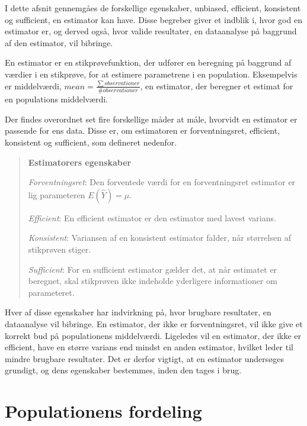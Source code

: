 \documentclass[]{book}
\theoremstyle{definition}
\theoremstyle{definition}
\theoremstyle{definition}
\theoremstyle{remark}
\let\BeginKnitrBlock\begin \let\EndKnitrBlock\end
\begin{document}
I dette afsnit gennemgåes de forskellige egenskaber, unbiased, efficient, konsistent og sufficient, en estimator kan have. Disse begreber giver et indblik i, hvor god en estimator er, og derved også, hvor valide resultater, en dataanalyse på baggrund af den estimator, vil bibringe.

En estimator er en stikprøvefunktion, der udfører en beregning på baggrund af værdier i en stikprøve, for at estimere parametrene i en population. Eksempelvis er middelværdi, \(mean = \frac{\sum observationer}{\# observationer}\), en estimator, der beregner et estimat for en populations middelværdi.

Der findes overordnet set fire forskellige måder at måle, hvorvidt en estimator er passende for ens data. Disse er, om estimatoren er forventningsret, efficient, konsistent og sufficient, som defineret nedenfor.

\begin{quote}
\BeginKnitrBlock{definition}
\protect\hypertarget{def:unnamed-chunk-5}{}{\label{def:unnamed-chunk-5} }\textbf{Estimatorers egenskaber} \citep{ASTAkursus3}

\emph{Forventningsret}: Den forventede værdi for en forventningsret estimator er lig parameteren \(E(\hat{Y}) = \mu\).

\emph{Efficient}: En efficient estimator er den estimator med lavest varians.

\emph{Konsistent}: Variansen af en konsistent estimator falder, når størrelsen af stikprøven stiger.

\emph{Sufficient}: For en sufficient estimator gælder det, at når estimatet er beregnet, skal stikprøven ikke indeholde yderligere informationer om parameteret.
\EndKnitrBlock{definition}
\end{quote}

Hver af disse egenskaber har indvirkning på, hvor brugbare resultater, en dataanalyse vil bibringe. En estimator, der ikke er forventningsret, vil ikke give et korrekt bud på populationens middelværdi. Ligeledes vil en estimator, der ikke er efficient, have en større varians end mindst en anden estimator, hvilket leder til mindre brugbare resultater. Det er derfor vigtigt, at en estimator undersøges grundigt, og dens egenskaber bestemmes, inden den tages i brug.

\hypertarget{populationens-fordeling}{%
\section{Populationens fordeling}\label{populationens-fordeling}}
\end{document}
